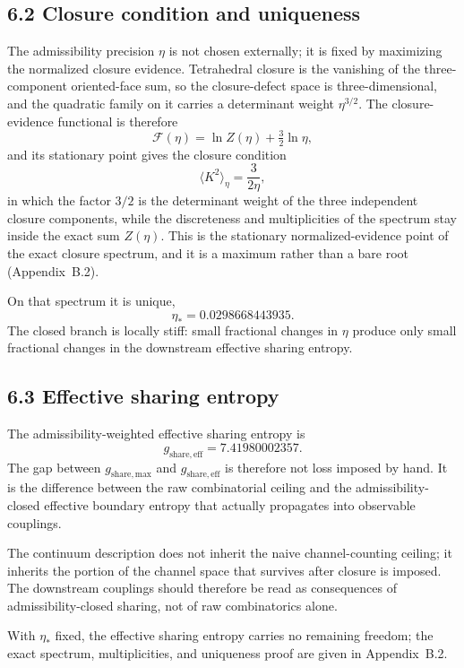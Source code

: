 \documentclass[11pt]{article}
\begin{document}
\subsection{6.2 Closure condition and uniqueness}

The admissibility precision $\eta$ is not chosen externally; it is fixed by maximizing the normalized closure evidence. Tetrahedral closure is the vanishing of the three-component oriented-face sum, so the closure-defect space is three-dimensional, and the quadratic family on it carries a determinant weight $\eta^{3/2}$. The closure-evidence functional is therefore
\[
\mathcal F(\eta)=\ln Z(\eta)+\tfrac32\ln\eta,
\]
and its stationary point gives the closure condition
\[
\langle K^2\rangle_\eta = \frac{3}{2\eta},
\]
in which the factor $3/2$ is the determinant weight of the three independent closure components, while the discreteness and multiplicities of the spectrum stay inside the exact sum $Z(\eta)$. This is the stationary normalized-evidence point of the exact closure spectrum, and it is a maximum rather than a bare root (Appendix~B.2).

On that spectrum it is unique,
\[
\eta_* = 0.0298668443935.
\]
The closed branch is locally stiff: small fractional changes in $\eta$ produce only small fractional changes in the downstream effective sharing entropy.

\subsection{6.3 Effective sharing entropy}

The admissibility-weighted effective sharing entropy is
\[
g_{\mathrm{share,eff}} = 7.41980002357.
\]
The gap between $g_{\mathrm{share,max}}$ and $g_{\mathrm{share,eff}}$ is therefore not loss imposed by hand. It is the difference between the raw combinatorial ceiling and the admissibility-closed effective boundary entropy that actually propagates into observable couplings.

The continuum description does not inherit the naive channel-counting ceiling; it inherits the portion of the channel space that survives after closure is imposed. The downstream couplings should therefore be read as consequences of admissibility-closed sharing, not of raw combinatorics alone.

With $\eta_*$ fixed, the effective sharing entropy carries no remaining freedom; the exact spectrum, multiplicities, and uniqueness proof are given in Appendix~B.2.
\end{document}
